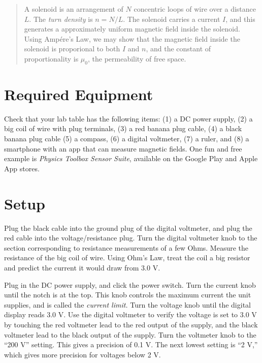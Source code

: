 \documentclass[12pt]{article}
\begin{document}
\maketitle

\begin{abstract}
A solenoid is an arrangement of $N$ concentric loops of wire over a distance $L$.  The \textit{turn density} is $n = N/L$.  The solenoid carries a current $I$, and this generates a approximately uniform magnetic field inside the solenoid.  Using Amp\'{e}re's Law, we may show that the magnetic field inside the solenoid is proporional to both $I$ and $n$, and the constant of proportionality is $\mu_0$, the permeability of free space.
\end{abstract}

\section{Required Equipment}

Check that your lab table has the following items: (1) a DC power supply, (2) a big coil of wire with plug terminals, (3) a red banana plug cable, (4) a black banana plug cable (5) a compass, (6) a digital voltmeter, (7) a ruler, and (8) a smartphone with an app that can measure magnetic fields.  One fun and free example is \textit{Physics Toolbox Sensor Suite}, available on the Google Play and Apple App stores.

\section{Setup}

Plug the black cable into the ground plug of the digital voltmeter, and plug the red cable into the voltage/resistance plug.  Turn the digital voltmeter knob to the section corresponding to resistance measurements of a few Ohms.  Measure the resistance of the big coil of wire.  Using Ohm's Law, treat the coil a big resistor and predict the current it would draw from 3.0 V.

Plug in the DC power supply, and click the power switch.  Turn the current knob until the notch is at the top.  This knob controls the maximum current the unit supplies, and is called the \textit{current limit.}  Turn the voltage knob until the digital display reads 3.0 V.  Use the digital voltmeter to verify the voltage is set to 3.0 V by touching the red voltmeter lead to the red output of the supply, and the black voltmeter lead to the black output of the supply.  Turn the voltmeter knob to the ``200 V'' setting.  This gives a precision of 0.1 V.  The next lowest setting is ``2 V,'' which gives more precision for voltages below 2 V.
\end{document}
